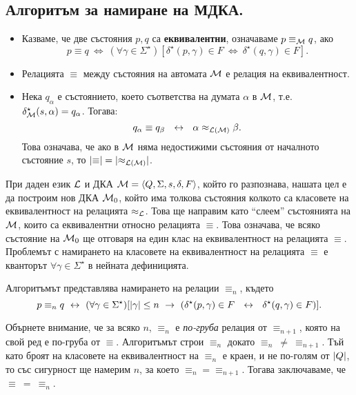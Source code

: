 \subsection{Алгоритъм за намиране на МДКА.}
\begin{itemize}
\item
  Казваме, че две състояния $p,q$ са {\bf еквивалентни}, означаваме $p\equiv_{\mathcal{M}} q$,
  ако \[p \equiv q\ \iff\ (\forall \gamma\in \Sigma^\star)[\delta^\star(p,\gamma) \in F\ \iff\ \delta^\star(q,\gamma) \in F].\]
\item
  Релацията $\equiv$ между състояния на автомата $\mathcal{M}$ е релация на еквивалентност. 
\item
  Нека $q_\alpha$ е състоянието, което съответства на думата $\alpha$ в $\mathcal{M}$, т.е.
  $\delta^\star_{\mathcal{M}}(s,\alpha) = q_\alpha$. Тогава:
  \[q_\alpha \equiv q_\beta\ \iff\ \alpha\approx_{\L(\M)} \beta.\]
  Това означава, че ако в $\mathcal{M}$ няма недостижими състояния от началното състояние $s$, то $\lvert{\equiv}\rvert = \lvert{\approx_{\mathcal{L}(\mathcal{M})}}\rvert$.
\end{itemize}

При даден език $\mathcal{L}$ и ДКА $\mathcal{M} = \langle{Q,\Sigma,s,\delta,F}\rangle$, който го разпознава, нашата цел е да построим нов ДКА $\mathcal{M}_0$,
който има толкова състояния колкото са класовете на еквивалентност на релацията $\approx_{\mathcal{L}}$.
Това ще направим като ``слеем'' състоянията на $\mathcal{M}$, които са еквивалентни относно релацията $\equiv$.
Това означава, че всяко състояние на $\mathcal{M}_0$ ще отговаря на един клас на еквивалентност на релацията $\equiv$.
Проблемът с намирането на класовете на еквивалентност на релацията $\equiv$ е кванторът $\forall \gamma \in \Sigma^\star$
в нейната дефиницията.

Алгоритъмът представлява намирането на релации $\equiv_n$, където
\[p\equiv_n q \iff (\forall\gamma\in\Sigma^\star)[\abs{\gamma}\leq n\ \rightarrow\ (\delta^\star(p,\gamma) \in F\ \iff\ \delta^\star(q,\gamma) \in F)].\]

Обърнете внимание, че за всяко $n$, $\equiv_n$ е {\em по-груба} релация от $\equiv_{n+1}$, 
която на свой ред е по-груба от $\equiv$.
Алгоритъмът строи $\equiv_n$ докато $\equiv_n\ \neq\ \equiv_{n+1}$.
Тъй като броят на класовете на еквивалентност на $\equiv_n$ е краен, и не по-голям от $\lvert{Q}\rvert$, то 
със сигурност ще намерим $n$, за което $\equiv_n = \equiv_{n+1}$.
Тогава заключаваме, че $\equiv\ =\ \equiv_n$.

